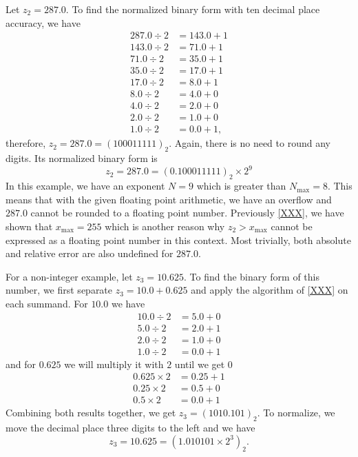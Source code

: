 \begin{exmp}
    Let \(z_2 = 287.0\). To find the normalized binary form with ten decimal place accuracy, we have
    \begin{align*}
        287.0 \div 2 &= 143.0 + 1 \\
        143.0 \div 2 &= 71.0 + 1 \\
        71.0 \div 2 &= 35.0 + 1 \\
        35.0 \div 2 &= 17.0 + 1 \\
        17.0 \div 2 &= 8.0 + 1 \\
        8.0 \div 2 &= 4.0 + 0 \\
        4.0 \div 2 &= 2.0 + 0 \\
        2.0 \div 2 &= 1.0 + 0 \\
        1.0 \div 2 &= 0.0 + 1 \text{,}
    \end{align*}
    therefore, \(z_2 = 287.0 = (100011111)_2\). Again, there is no need to round any digits. Its normalized binary form is
    \begin{equation*}
        z_2 = 287.0 = (0.100011111)_2 \times 2^9
    \end{equation*}
    In this example, we have an exponent \(N = 9\) which is greater than \(N_{\text{max}} = 8\). This means that with the given floating point arithmetic, we have an overflow and \(287.0\) cannot be rounded to a floating point number. Previously \ref{XXX}, we have shown that \(x_{\text{max}} = 255\) which is another reason why \(z_2 > x_{\text{max}}\) cannot be expressed as a floating point number in this context.
    Most trivially, both absolute and relative error are also undefined for \(287.0\).
\end{exmp}
\begin{exmp}
    For a non-integer example, let \(z_3 = 10.625\). To find the binary form of this number, we first separate \(z_3 = 10.0 + 0.625\) and apply the algorithm of \ref{XXX} on each summand. For \(10.0\) we have
    \begin{align*}
        10.0 \div 2 &= 5.0 + 0 \\
        5.0 \div 2 &= 2.0 + 1 \\
        2.0 \div 2 &= 1.0 + 0 \\
        1.0 \div 2 &= 0.0 + 1
    \end{align*}
    and for \(0.625\) we will multiply it with \(2\) until we get \(0\)
    \begin{align*}
        0.625 \times 2 &= 0.25 + 1 \\
        0.25 \times 2 &= 0.5 + 0 \\
        0.5 \times 2 &= 0.0 + 1
    \end{align*}
    Combining both results together, we get \(z_3 = (1010.101)_2\). To normalize, we move the decimal place three digits to the left and we have
    \begin{equation*}
        z_3 = 10.625 = (1.010101 \times 2^3)_2 \text{.}
    \end{equation*}
\end{exmp}
